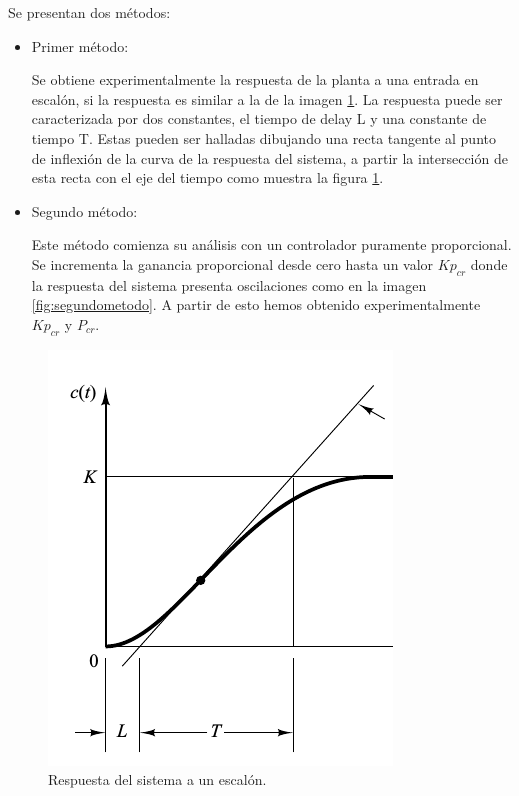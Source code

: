 Se presentan dos métodos:
\begin{itemize}
 \item Primer método:
 
 Se obtiene experimentalmente la respuesta de la planta a una entrada en escalón,
 si la respuesta es similar a la de la imagen \ref{fig:primermetodo}.
 La respuesta puede ser caracterizada por dos constantes, el tiempo de delay L y una
 constante de tiempo T. Estas pueden ser halladas dibujando una recta tangente al 
 punto de inflexión de la curva de la respuesta del sistema, a partir la intersección de
 esta recta con el eje del tiempo como muestra la figura \ref{fig:primermetodo}.
 
 \item Segundo método:
 
 Este método comienza su análisis con un controlador puramente proporcional. Se incrementa 
 la ganancia proporcional desde cero hasta un valor $Kp_{cr} $ donde la respuesta del 
 sistema presenta oscilaciones como en la imagen \ref{fig:segundometodo}.
 A partir de esto hemos obtenido experimentalmente $Kp_{cr} $ y $P_{cr} $.
\end{itemize}


\begin{figure}
 \centering
 \includegraphics[scale=0.5]{Cap4-ProgramacionPLC/images/primermetodo.png}
 \caption{Respuesta del sistema a un escalón.}
 \label{fig:primermetodo}
\end{figure}


